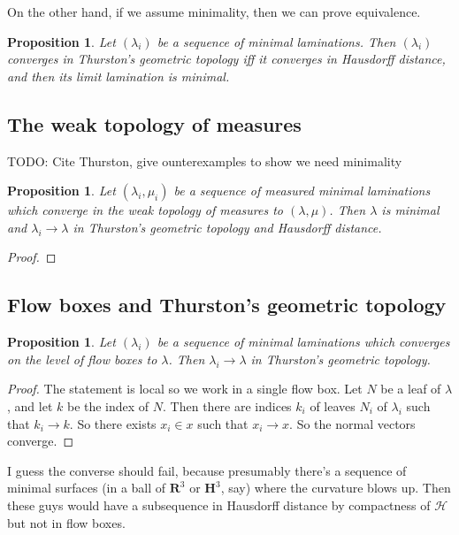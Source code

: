\documentclass[reqno,10pt]{amsart}
\newcommand{\RR}{\mathbf{R}}
\newcommand{\Hyp}{\mathbf H}
\newtheorem{proposition}[theorem]{Proposition}
\theoremstyle{definition}
\numberwithin{equation}{section}
\begin{document}
On the other hand, if we assume minimality, then we can prove equivalence.

\begin{proposition}
Let $(\lambda_i)$ be a sequence of minimal laminations.
Then $(\lambda_i)$ converges in Thurston's geometric topology iff it converges in Hausdorff distance, and then its limit lamination is minimal.
\end{proposition}




\subsection{The weak topology of measures}
TODO: Cite Thurston, give ounterexamples to show we need minimality

\begin{proposition}
Let $(\lambda_i, \mu_i)$ be a sequence of measured minimal laminations which converge in the weak topology of measures to $(\lambda, \mu)$.
Then $\lambda$ is minimal and $\lambda_i \to \lambda$ in Thurston's geometric topology and Hausdorff distance.
\end{proposition}
\begin{proof}

\end{proof}


\subsection{Flow boxes and Thurston's geometric topology}
\begin{proposition}
Let $(\lambda_i)$ be a sequence of minimal laminations which converges on the level of flow boxes to $\lambda$.
Then $\lambda_i \to \lambda$ in Thurston's geometric topology.
\end{proposition}
\begin{proof}
The statement is local so we work in a single flow box.
Let $N$ be a leaf of $\lambda$, and let $k$ be the index of $N$.
Then there are indices $k_i$ of leaves $N_i$ of $\lambda_i$ such that $k_i \to k$.
So there exists $x_i \in x$ such that $x_i \to x$.
So the normal vectors converge.
\end{proof}

I guess the converse should fail, because presumably there's a sequence of minimal surfaces (in a ball of $\RR^3$ or $\Hyp^3$, say) where the curvature blows up.
Then these guys would have a subsequence in Hausdorff distance by compactness of $\mathscr H$ but not in flow boxes.
\end{document}
